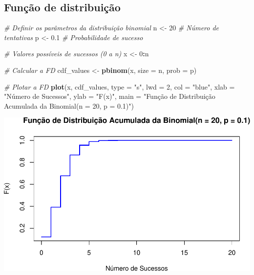 \documentclass[
]{book}
\newenvironment{Shaded}{\begin{snugshade}}{\end{snugshade}}
\newcommand{\AttributeTok}[1]{\textcolor[rgb]{0.13,0.29,0.53}{#1}}
\newcommand{\CommentTok}[1]{\textcolor[rgb]{0.56,0.35,0.01}{\textit{#1}}}
\newcommand{\DecValTok}[1]{\textcolor[rgb]{0.00,0.00,0.81}{#1}}
\newcommand{\FloatTok}[1]{\textcolor[rgb]{0.00,0.00,0.81}{#1}}
\newcommand{\FunctionTok}[1]{\textcolor[rgb]{0.13,0.29,0.53}{\textbf{#1}}}
\newcommand{\NormalTok}[1]{#1}
\newcommand{\OtherTok}[1]{\textcolor[rgb]{0.56,0.35,0.01}{#1}}
\newcommand{\SpecialCharTok}[1]{\textcolor[rgb]{0.81,0.36,0.00}{\textbf{#1}}}
\newcommand{\StringTok}[1]{\textcolor[rgb]{0.31,0.60,0.02}{#1}}
\begin{document}
\subsection{Função de distribuição}\label{funuxe7uxe3o-de-distribuiuxe7uxe3o}

\begin{Shaded}
\begin{Highlighting}[]
\CommentTok{\# Definir os parâmetros da distribuição binomial}
\NormalTok{n }\OtherTok{\textless{}{-}} \DecValTok{20} \CommentTok{\# Número de tentativas}
\NormalTok{p }\OtherTok{\textless{}{-}} \FloatTok{0.1} \CommentTok{\# Probabilidade de sucesso}

\CommentTok{\# Valores possíveis de sucessos (0 a n)}
\NormalTok{x }\OtherTok{\textless{}{-}} \DecValTok{0}\SpecialCharTok{:}\NormalTok{n}

\CommentTok{\# Calcular a FD}
\NormalTok{cdf\_values }\OtherTok{\textless{}{-}} \FunctionTok{pbinom}\NormalTok{(x, }\AttributeTok{size =}\NormalTok{ n, }\AttributeTok{prob =}\NormalTok{ p)}

\CommentTok{\# Plotar a FD}
\FunctionTok{plot}\NormalTok{(x, cdf\_values, }\AttributeTok{type =} \StringTok{"s"}\NormalTok{, }\AttributeTok{lwd =} \DecValTok{2}\NormalTok{, }\AttributeTok{col =} \StringTok{"blue"}\NormalTok{, }
\AttributeTok{xlab =} \StringTok{"Número de Sucessos"}\NormalTok{, }\AttributeTok{ylab =} \StringTok{"F(x)"}\NormalTok{, }
\AttributeTok{main =} \StringTok{"Função de Distribuição Acumulada da Binomial(n = 20, p = 0.1)"}\NormalTok{)}
\end{Highlighting}
\end{Shaded}

\includegraphics{introR_files/figure-latex/unnamed-chunk-250-1.pdf}
\end{document}
